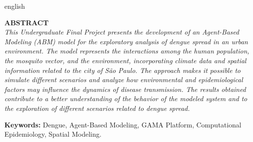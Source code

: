 \documentclass[
    12pt,
    openright,
    oneside,
    a4paper,
    english,
    brazil
]{abntex2}
\begin{document}
\begin{resumo}[Abstract]
    \begin{otherlanguage*}{english}

\vspace{8cm}

\begin{center}
\textbf{ABSTRACT}\\[0.5cm]
\textit{This Undergraduate Final Project presents the development of an Agent-Based Modeling (ABM) model for the exploratory analysis of dengue spread in an urban environment. The model represents the interactions among the human population, the mosquito vector, and the environment, incorporating climate data and spatial information related to the city of São Paulo. The approach makes it possible to simulate different scenarios and analyze how environmental and epidemiological factors may influence the dynamics of disease transmission. The results obtained contribute to a better understanding of the behavior of the modeled system and to the exploration of different scenarios related to dengue spread.}
\end{center}

\vspace{6cm}

\textbf{Keywords:} Dengue, Agent-Based Modeling, GAMA Platform, Computational Epidemiology, Spatial Modeling.
    \end{otherlanguage*}
\end{resumo}
\cleardoublepage


\begin{fichacatalografica}
    \vspace*{\fill}
    \noindent
    \vspace*{\fill}
\end{fichacatalografica}
\cleardoublepage
\end{document}
